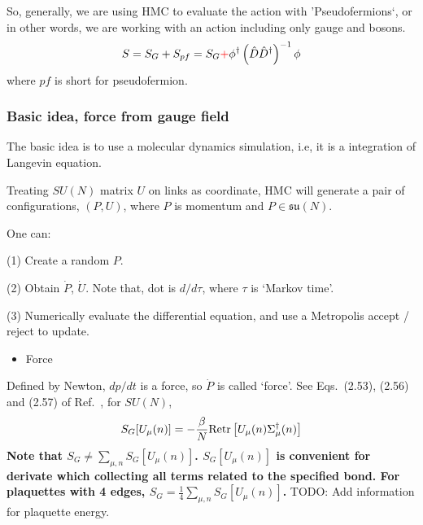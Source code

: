 So, generally, we are using HMC to evaluate the action with 'Pseudofermions`, or in other words, we are working with an action including only gauge and bosons.
\begin{equation}
\begin{split}
&S=S_G+S_{pf}=S_G\textcolor[rgb]{1,0,0}{+}\phi ^{\dagger}\left(\hat{D}\hat{D}^{\dagger}\right)^{-1} \phi\\
\end{split}
\end{equation}
where $pf$ is short for pseudofermion.

\subsubsection{\label{hmc_scheme}Basic idea, force from gauge field}

The basic idea is to use a molecular dynamics simulation, i.e, it is a integration of Langevin equation.

Treating $SU(N)$ matrix $U$ on links as coordinate, HMC will generate a pair of configurations, $(P,U)$, where $P$ is momentum and $P\in \mathfrak{su}(N)$.

One can:

(1) Create a random $P$.

(2) Obtain $\dot{P}$, $\dot{U}$. Note that, dot is $d/d\tau$, where $\tau$ is `Markov time'.

(3) Numerically evaluate the differential equation, and use a Metropolis accept / reject to update.

\begin{itemize}
\item {}Force
\end{itemize}

Defined by Newton, $dp/dt$ is a force, so $\dot{P}$ is called `force'. See Eqs.~(2.53), (2.56) and (2.57) of Ref.~\cite{latticeqcdbook2017}, for $SU(N)$,
\begin{equation}
\begin{split}
&S_G[U_{\mu}(n)]=-\frac{\beta}{N}{\rm Re}{\rm tr}\left[U_{\mu}(n)\Sigma ^{\dagger}_{\mu}(n)\right]\\
\end{split}
\label{eq.hmc.staple}
\end{equation}
\textbf{Note that $S_G\neq \sum _{\mu,n} S_G[U_{\mu}(n)]$. $S_G[U_{\mu}(n)]$ is convenient for derivate which collecting all terms related to the specified bond. For plaquettes with 4 edges, $S_G=\frac{1}{4} \sum _{\mu,n} S_G[U_{\mu}(n)]$. } \textcolor[rgb]{0,0,1}{TODO: Add information for plaquette energy.}

